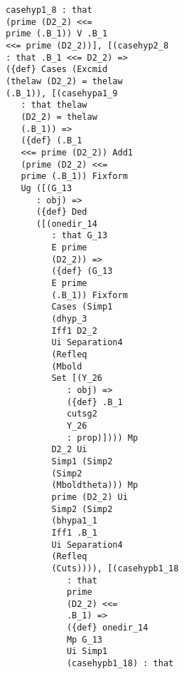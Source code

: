 \documentclass[12pt]{article}
\begin{document}
\begin{verbatim}
                         casehyp1_8 : that 
                         (prime (D2_2) <<= 
                         prime (.B_1)) V .B_1 
                         <<= prime (D2_2))], [(casehyp2_8 
                         : that .B_1 <<= D2_2) => 
                         ({def} Cases (Excmid 
                         (thelaw (D2_2) = thelaw 
                         (.B_1)), [(casehypa1_9 
                            : that thelaw 
                            (D2_2) = thelaw 
                            (.B_1)) => 
                            ({def} (.B_1 
                            <<= prime (D2_2)) Add1 
                            (prime (D2_2) <<= 
                            prime (.B_1)) Fixform 
                            Ug ([(G_13 
                               : obj) => 
                               ({def} Ded 
                               ([(onedir_14 
                                  : that G_13 
                                  E prime 
                                  (D2_2)) => 
                                  ({def} (G_13 
                                  E prime 
                                  (.B_1)) Fixform 
                                  Cases (Simp1 
                                  (dhyp_3 
                                  Iff1 D2_2 
                                  Ui Separation4 
                                  (Refleq 
                                  (Mbold 
                                  Set [(Y_26 
                                     : obj) => 
                                     ({def} .B_1 
                                     cutsg2 
                                     Y_26 
                                     : prop)]))) Mp 
                                  D2_2 Ui 
                                  Simp1 (Simp2 
                                  (Simp2 
                                  (Mboldtheta))) Mp 
                                  prime (D2_2) Ui 
                                  Simp2 (Simp2 
                                  (bhypa1_1 
                                  Iff1 .B_1 
                                  Ui Separation4 
                                  (Refleq 
                                  (Cuts)))), [(casehypb1_18 
                                     : that 
                                     prime 
                                     (D2_2) <<= 
                                     .B_1) => 
                                     ({def} onedir_14 
                                     Mp G_13 
                                     Ui Simp1 
                                     (casehypb1_18) : that 

\end{verbatim}
\end{document}
